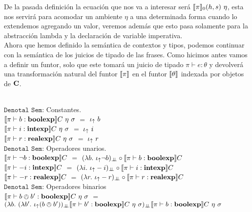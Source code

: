 De la pasada definici\'on la ecuaci\'on que nos va a interesar ser\'a $\llbracket \pi \rrbracket_0(h,s) \ \eta$,
esta nos servir\'a para acomodar un ambiente $\eta$ a una determinada forma cuando lo extendemos
agregando un valor, veremos adem\'as que esto pasa solamente para la abstracci\'on lambda y
la declaraci\'on de variable imperativa.\\

Ahora que hemos definido la sem\'antica de contextos y tipos, podemos continuar con
la sem\'antica de los juicios de tipado de las frases. Como hicimos antes vamos a definir un 
funtor, solo que este tomar\'a un juicio de tipado $\pi \vdash e : \theta$ y 
devolver\'a una transformaci\'on natural del funtor $\llbracket \pi \rrbracket$ en el funtor $\llbracket \theta \rrbracket$ 
indexada por objetos de $\textbf{C}$.\\
\

\noindent
$\texttt{Denotal Sem:}$ Constantes.\\

$\llbracket  \pi \vdash b : \textbf{boolexp}  \rrbracket C \ \eta \ \sigma$ $=$ $\iota_{\uparrow} \ b$\\

$\llbracket  \pi \vdash i : \textbf{intexp}   \rrbracket C \ \eta \ \sigma$ $=$ $\iota_{\uparrow} \ i$\\

$\llbracket  \pi \vdash r : \textbf{realexp}  \rrbracket C \ \eta \ \sigma$ $=$ $\iota_{\uparrow} \ r$\\

\noindent
$\texttt{Denotal Sem:}$ Operadores unarios.\\

$\llbracket  \pi \vdash \neg b : \textbf{boolexp}  \rrbracket C$ 
$=$ 
$(\lambda b . \ \iota_{\uparrow} \neg b)_{\bot \!\!\! \bot} \circ \llbracket \pi \vdash b : \textbf{boolexp} \rrbracket C$\\

$\llbracket  \pi \vdash -i : \textbf{intexp}  \rrbracket C$ 
$=$ 
$(\lambda i . \ \iota_{\uparrow} -i)_{\bot \!\!\! \bot} \circ \llbracket \pi \vdash i : \textbf{intexp} \rrbracket C$\\

$\llbracket  \pi \vdash -r : \textbf{realexp}  \rrbracket C$ 
$=$ 
$(\lambda r . \ \iota_{\uparrow} -r)_{\bot \!\!\! \bot} \circ \llbracket \pi \vdash r : \textbf{realexp} \rrbracket C$\\

\noindent
$\texttt{Denotal Sem:}$ Operadores binarios\\

$\llbracket  \pi \vdash b \owedge b' : \textbf{boolexp}  \rrbracket C \ \eta \ \sigma$ 
$=$ \\
\indent \indent \indent
$(\lambda b . \ (\lambda b' . \ \iota_{\uparrow} (b \owedge b'))_{\bot \!\!\! \bot}
\llbracket \pi \vdash b' : \textbf{boolexp} \rrbracket C \ \eta \ \sigma)_{\bot \!\!\! \bot}
\llbracket \pi \vdash b : \textbf{boolexp} \rrbracket C \ \eta \ \sigma$\\

